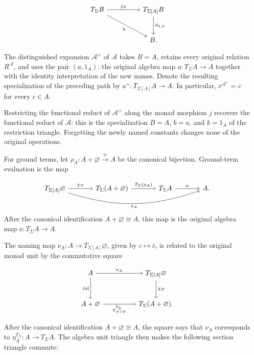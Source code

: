 \documentclass[11pt]{article}
\theoremstyle{definition}
\begin{document}
\[
\begin{tikzcd}[row sep=large,column sep=huge]
T_\Sigma B \arrow[r,"j_B"] \arrow[dr,"b"'] &
T_{\Sigma[A]}B \arrow[d,"{h_{b,k}}"] \\
& B.
\end{tikzcd}
\]

The distinguished expansion \(\mathcal A^+\) of \(\mathcal A\) takes
\(B=A\), retains every original relation \(R^{\mathcal A}\), and uses the pair
\((a,1_A)\): the original algebra map \(a:T_\Sigma A\to A\) together with the
identity interpretation of the new names. Denote the resulting specialization
of the preceding path by \(a^+:T_{\Sigma[A]}A\to A\).
In particular, \(\bar c^{\mathcal A^+}=c\) for every \(c\in A\).

Restricting the functional reduct of \(\mathcal A^+\) along the monad
morphism \(j\) recovers the functional reduct of \(\mathcal A\):
this is the specialization \(B=A\), \(b=a\), and \(k=1_A\) of the restriction
triangle. Forgetting the newly named constants changes none of the original
operations.

For ground terms, let \(\rho_A:A+\varnothing\xrightarrow{\cong}A\) be the
canonical bijection. Ground-term evaluation is the map

\[
\begin{tikzcd}[column sep=large]
T_{\Sigma[A]}\varnothing \arrow[r,"\chi_\varnothing"]
  \arrow[rrr,bend right=18,"e_A"'] &
T_\Sigma(A+\varnothing) \arrow[r,"T_\Sigma(\rho_A)"] &
T_\Sigma A \arrow[r,"a"] & A.
\end{tikzcd}
\]
After the canonical identification \(A+\varnothing\cong A\), this map is the
original algebra map \(a:T_\Sigma A\to A\).

The naming map \(\nu_A:A\to T_{\Sigma[A]}\varnothing\), given by
\(c\mapsto\bar c\), is related to the original monad unit by the commutative
square

\[
\begin{tikzcd}[row sep=large,column sep=huge]
A \arrow[r,"\nu_A"] \arrow[d,"\operatorname{inl}"'] &
T_{\Sigma[A]}\varnothing \arrow[d,"\chi_\varnothing"] \\
A+\varnothing \arrow[r,"\eta^{T_\Sigma}_{A+\varnothing}"'] &
T_\Sigma(A+\varnothing).
\end{tikzcd}
\]

After the canonical identification \(A+\varnothing\cong A\), the square says
that \(\nu_A\) corresponds to \(\eta_A^{T_\Sigma}:A\to T_\Sigma A\). The
algebra unit triangle then makes the following section triangle commute:
\end{document}
